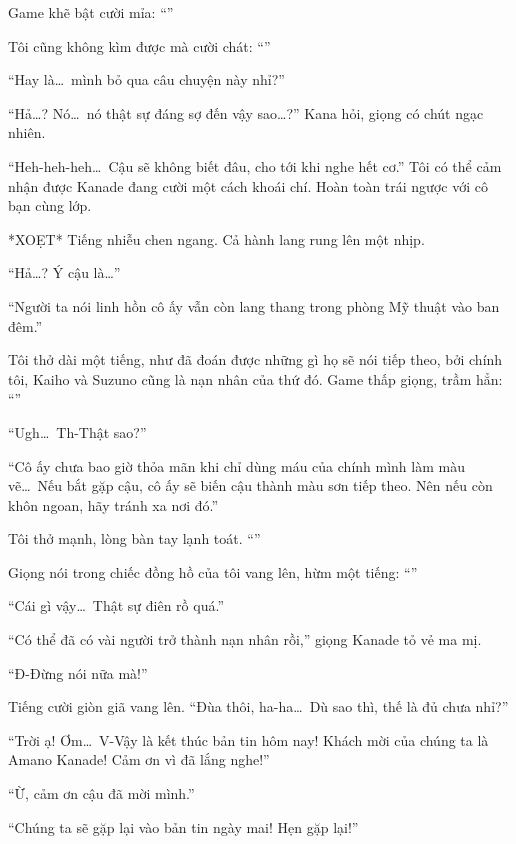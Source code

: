 \documentclass[../main.tex]{subfiles}
\begin{document}
Game khẽ bật cười mỉa: ``''

Tôi cũng không kìm được mà cười chát: ``''

``Hay là\dots\ mình bỏ qua câu chuyện này nhỉ?''

``Hả\dots? Nó\dots\ nó thật sự đáng sợ đến vậy sao\dots?'' Kana hỏi, giọng có chút ngạc nhiên.

``Heh-heh-heh\dots\ Cậu sẽ không biết đâu, cho tới khi nghe hết cơ.'' Tôi có thể cảm nhận được Kanade đang cười một cách khoái chí. Hoàn toàn trái ngược với cô bạn cùng lớp.

*XOẸT* Tiếng nhiễu chen ngang. Cả hành lang rung lên một nhịp.

``Hả\dots? Ý cậu là\dots''

``Người ta nói linh hồn cô ấy vẫn còn lang thang trong phòng Mỹ thuật vào ban đêm.''

Tôi thở dài một tiếng, như đã đoán được những gì họ sẽ nói tiếp theo, bởi chính tôi, Kaiho và Suzuno cũng là nạn nhân của thứ đó. Game thấp giọng, trầm hẳn: ``''

``Ugh\dots\ Th-Thật sao?''

``Cô ấy chưa bao giờ thỏa mãn khi chỉ dùng máu của chính mình làm màu vẽ\dots\ Nếu bắt gặp cậu, cô ấy sẽ biến cậu thành màu sơn tiếp theo. Nên nếu còn khôn ngoan, hãy tránh xa nơi đó.''

Tôi thở mạnh, lòng bàn tay lạnh toát. ``''

Giọng nói trong chiếc đồng hồ của tôi vang lên, hừm một tiếng: ``''

``Cái gì vậy\dots\ Thật sự điên rồ quá.''

``Có thể đã có vài người trở thành nạn nhân rồi,'' giọng Kanade tỏ vẻ ma mị.

``Đ-Đừng nói nữa mà!''

Tiếng cười giòn giã vang lên. ``Đùa thôi, ha-ha\dots\ Dù sao thì, thế là đủ chưa nhỉ?''

``Trời ạ! Ơm\dots\ V-Vậy là kết thúc bản tin hôm nay! Khách mời của chúng ta là Amano Kanade! Cảm ơn vì đã lắng nghe!''

``Ừ, cảm ơn cậu đã mời mình.''

``Chúng ta sẽ gặp lại vào bản tin ngày mai! Hẹn gặp lại!''
\end{document}
